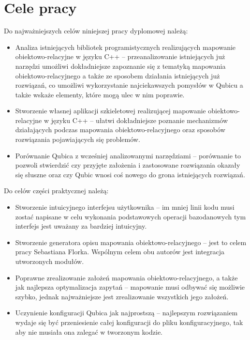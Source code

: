 \documentclass[12pt]{report}
\begin{document}
\section{Cele pracy}

Do najważniejszych celów niniejszej pracy dyplomowej należą:

\begin{itemize}
\item Analiza istniejących bibliotek programistycznych realizujących ma\-po\-wa\-nie obiektowo-relacyjne w języku C++ -- przeanalizowanie istniejących już na\-rzędzi
umożliwi dokładniejsze zapoznanie się z tematyką mapowania obiekt\-owo-relacyjnego a także ze sposobem działania istniejących już rozwiązań, co umożliwi wykorzystanie 
najciekawszych pomysłów w Qubicu a także wskaże elementy, które mogą ulec w nim poprawie.
\item Stworzenie własnej aplikacji szkieletowej realizującej mapowanie obiektowo-relacyjne w języku C++ -- ułatwi dokładniejsze poznanie mechanizmów dzia\-łających
podczas mapowania obiektowo-relacyjnego oraz sposobów ro\-zwią\-zania pojawiających się problemów.
\item Porównanie Qubica z wcześniej analizowanymi narzędziami -- porównanie to pozwoli stwierdzić czy przyjęte założenia i zastosowane rozwiązania okazały się słuszne
oraz czy Qubic wnosi coś nowego do grona istniejących rozwiązań.
\end{itemize}

\newpage

Do celów części praktycznej należą:

\begin{itemize}
\item Stworzenie intuicyjnego interfejsu użytkownika -- im mniej linii kodu musi zostać napisane w celu wykonania podstawowych operacji bazodanowych tym interfejs jest 
uważany za bardziej intuicyjny.
\item Stworzenie generatora opisu mapowania obiektowo-relacyjnego -- jest to celem pracy Sebastiana Florka. Wspólnym celem obu autorów jest integracja utworzonych  modułów.
\item Poprawne zrealizowanie założeń mapowania obiektowo-relacyjnego, a także jak najlepsza optymalizacja zapytań -- mapowanie musi odbywać się możliwie szybko, jednak
najważniejsze jest zrealizowanie wszystkich jego założeń.
\item Uczynienie konfiguracji Qubica jak najprostszą -- najlepszym rozwiązaniem wydaje się być przeniesienie całej konfiguracji do pliku konfiguracyjnego, tak aby nie musiała
ona zalegać w tworzonym kodzie.
\end{itemize}
\end{document}
